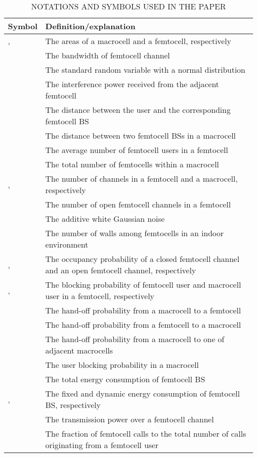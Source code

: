 \documentclass[10pt,final,journal,letterpaper,twoside,twocolumn]{IEEEtran}
\begin{document}
\begin{table*}[htbp]
\centering
\caption{NOTATIONS AND SYMBOLS USED IN THE PAPER}
\begin{tabular}{l|l}
\hline Symbol & Definition/explanation \\
\hline
,  & The areas of a macrocell and a femtocell, respectively \\
 & The bandwidth of femtocell channel \\
 & The standard random variable with a normal distribution \\
 & The interference power received from the  adjacent femtocell \\
 & The distance between the user and the corresponding femtocell BS \\
 & The distance between two femtocell BSs in a macrocell \\
 & The average number of femtocell users in a femtocell \\
 & The total number of femtocells within a macrocell \\
,  & The number of channels in a femtocell and a macrocell, respectively \\
 & The number of open femtocell channels in a femtocell \\
 & The additive white Gaussian noise \\
 & The number of walls among femtocells in an indoor environment \\
,  & The occupancy probability of a closed femtocell channel and an open femtocell channel, respectively \\
,  & The blocking probability of femtocell user and macrocell user in a femtocell, respectively\\
 & The hand-off probability from a macrocell to a femtocell \\
 & The hand-off probability from a femtocell to a macrocell \\
 & The hand-off probability from a macrocell to one of adjacent macrocells \\
 & The user blocking probability in a macrocell\\
 & The total energy consumption of femtocell BS \\
,  & The fixed and dynamic energy consumption of femtocell BS, respectively \\
 & The transmission power over a femtocell channel \\
 & The fraction of femtocell calls to the total number of calls originating from a femtocell user \\

\end{tabular}
\end{table*}
\end{document}
